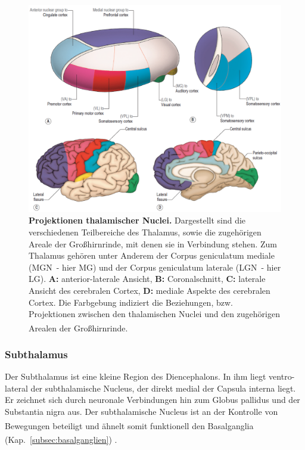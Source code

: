 \documentclass[12pt,a4paper,pdftex]{article}
\begin{document}
\begin{figure}[H]
    \centering
    \includegraphics[width=\textwidth]{pictures/Bilder_Jule/Andere/thalamus.png}
    \caption[Projektionen thalamischer Nuclei]{\textbf{Projektionen thalamischer Nuclei.} Dargestellt sind die verschiedenen Teilbereiche des Thalamus, sowie die zugehörigen Areale der Großhirnrinde, mit denen sie in Verbindung stehen. Zum Thalamus gehören unter Anderem der Corpus geniculatum mediale (MGN~- hier MG) und der Corpus geniculatum laterale (LGN~- hier LG). \textbf{A:} anterior-laterale Ansicht, \textbf{B:} Coronalschnitt, \textbf{C:} laterale Ansicht des cerebralen Cortex, \textbf{D:} mediale Aspekte des cerebralen Cortex. Die Farbgebung indiziert die Beziehungen, bzw. Projektionen zwischen den thalamischen Nuclei und den zugehörigen Arealen der Großhirnrinde. \textsuperscript{\cite[12]{crossman2014neuroanatomy}}}
    \label{fig:thalamus_nuclei}
\end{figure}

\subsubsection{Subthalamus} 

Der Subthalamus ist eine kleine Region des Diencephalons. In ihm liegt ventro-lateral der subthalamische Nucleus, der direkt medial der Capsula interna liegt. Er zeichnet sich durch neuronale Verbindungen hin zum Globus pallidus und der Substantia nigra aus. Der subthalamische Nucleus ist an der Kontrolle von Bewegungen beteiligt \textsuperscript{\cite[12]{crossman2014neuroanatomy}} und ähnelt somit funktionell den Basalganglia (Kap.~\ref{subsec:basalganglien}) \textsuperscript{\cite[16]{crossman2014neuroanatomy}}.
\end{document}

